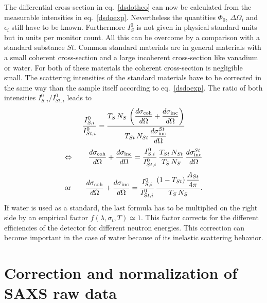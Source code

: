 The differential cross-section in eq.\ \ref{dsdotheo} can now be calculated from the measurable
intensities in eq.\ \ref{dsdoexp}. Nevertheless the quantities $\Phi_0$, $\Delta\Omega_i$ and
$\epsilon_i$ still have to be known. Furthermore $I_S^0$ is not given in physical standard units
but in units per monitor count. All this can be overcome by a comparison with a standard substance
$St$. Common standard materials are in general materials with a small coherent cross-section and a
large incoherent cross-section like vanadium or water. For both of these materials the coherent
cross-section is negligible small. The scattering intensities of the standard materials have to be
corrected in the same way than the sample itself according to eq.\ \ref{dsdoexp}. The ratio of both
intensities $I^0_{S,i}/I^0_{St,i}$ leads to
\begin{equation}
\frac{I^0_{S,i}}{I^0_{St,i}} = \frac{T_S\, N_S\, \displaystyle
\left(\frac{d\sigma_{\rm coh}}{d \Omega} +
\frac{d\sigma_{\rm inc}}{d\Omega} \right)}{T_{St}\,N_{St}\, \displaystyle
\frac{d\sigma^{St}_{\rm inc}}{d\Omega}}
\end{equation}
\begin{equation}
\Leftrightarrow \qquad \displaystyle
\frac{d\sigma_{\rm coh}}{d\Omega} + \frac{d\sigma_{\rm inc}}{d\Omega} =
\frac{I^0_{S,i}}{I^0_{St,i}} \, \frac{T_{St}\, N_{St}}{T_S\, N_S}\,
\displaystyle
\frac{d\sigma^{St}_{\rm inc}}{d\Omega}
\end{equation}
\begin{equation} \displaystyle
\mbox{or}\qquad
\frac{d\sigma_{\rm coh}}{d\Omega} + \frac{d\sigma_{\rm inc}}{d\Omega} =
\frac{I^0_{S,i}}{I^0_{St,i}} \, \frac{(1-T_{St})\, \displaystyle
\frac{A_{St}}{4\pi}}{T_S\, N_S} .
\end{equation}
If water is used as a standard, the last formula has to be multiplied on the right
side by an empirical factor $f(\lambda,\sigma_t,T) \simeq 1$. This factor corrects for
the different efficiencies of the detector for different neutron energies. This correction
can become important in the case of water because of its inelastic scattering behavior.

\section{Correction and normalization of SAXS raw data}
